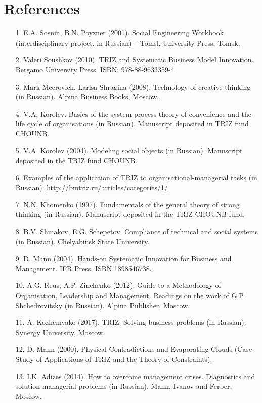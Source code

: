 \documentclass[11pt,a4paper]{book}
\begin{document}
\chapter{References}
\begin{itemize}
\item[1.] E.A. Sosnin, B.N. Poyzner (2001). Social Engineering Workbook
  (interdisciplinary project, in Russian) -- Tomsk University Press, Tomsk.
\item[2.] Valeri Soushkov (2010). TRIZ and Systematic Business Model
  Innovation.  Bergamo University Press. ISBN: 978-88-9633359-4
\item[3.] Mark Meerovich, Larisa Shragina (2008). Technology of creative
  thinking (in Russian). Alpina Business Books, Moscow.
\item[4.] V.A. Korolev. Basics of the system-process theory of convenience and
  the life cycle of organisations (in Russian). Manuscript deposited in TRIZ
  fund CHOUNB.
\item[5.] V.A. Korolev (2004). Modeling social objects (in
  Russian). Manuscript deposited in the TRIZ fund CHOUNB.
\item[6.] Examples of the application of TRIZ to organisational-managerial
  tasks (in Russian). \url{http://bmtriz.ru/articles/categories/1/}
\item[7.] N.N. Khomenko (1997). Fundamentals of the general theory of strong
  thinking (in Russian). Manuscript deposited in the TRIZ CHOUNB fund.
\item[8.] B.V. Shmakov, E.G. Schepetov. Compliance of technical and social
  systems (in Russian). Chelyabinsk State University.
\item[9.] D. Mann (2004). Hands-on Systematic Innovation for Business and
  Management. IFR Press. ISBN 1898546738.
\item[10.] A.G. Reus, A.P. Zinchenko (2012). Guide to a Methodology of
  Organisation, Leadership and Management. Readings on the work of
  G.P. Shchedrovitsky (in Russian). Alpina Publisher, Moscow.
\item[11.] A. Kozhemyako (2017). TRIZ: Solving business problems (in Russian).
  Synergy University, Moscow.
\item[12.] D. Mann (2000). Physical Contradictions and Evaporating Clouds
  (Case Study of Applications of TRIZ and the Theory of Constraints).
\item[13.] I.K. Adizes (2014). How to overcome management crises. Diagnostics
  and solution managerial problems (in Russian). Mann, Ivanov and Ferber,
  Moscow.

\end{itemize}
\end{document}
